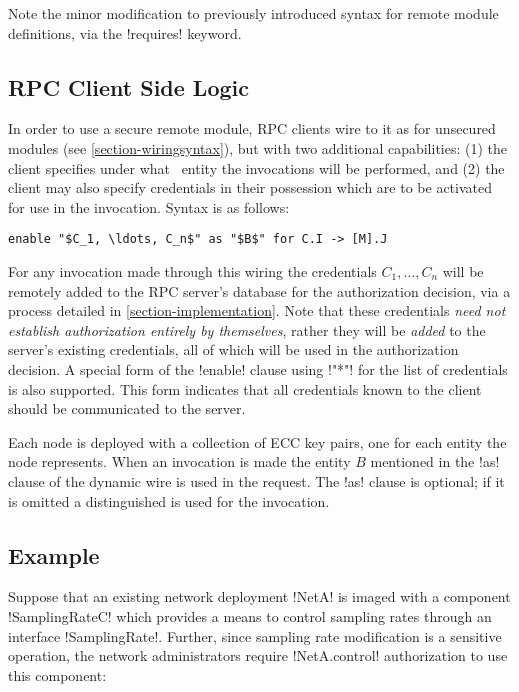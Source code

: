Note the minor modification to previously introduced syntax for remote module definitions, via
the !requires! keyword.

\subsection{RPC Client Side Logic}
\label{section-rpc-client-side}

In order to use a secure remote module, RPC clients wire to it as for unsecured modules (see
\autoref{section-wiringsyntax}), but with two additional capabilities: (1) the client specifies
under what \RT\ entity the invocations will be performed, and (2) the client may also specify
credentials in their possession which are to be activated for use in the invocation. Syntax is
as follows:
\begin{lstlisting}[mathescape=true]
enable "$C_1, \ldots, C_n$" as "$B$" for C.I -> [M].J
\end{lstlisting}
For any invocation made through this wiring the credentials $C_1, \ldots, C_n$ will be remotely
added to the RPC server's database for the authorization decision, via a process detailed in
\autoref{section-implementation}. Note that these credentials \emph{need not establish
  authorization entirely by themselves}, rather they will be \emph{added} to the server's
existing credentials, all of which will be used in the authorization decision. A special form of
the !enable! clause using !"*"! for the list of credentials is also supported. This form
indicates that all credentials known to the client should be communicated to the server.

Each node is deployed with a collection of ECC key pairs, one for each entity the node
represents. When an invocation is made the entity $B$ mentioned in the !as! clause of the
dynamic wire is used in the request. The !as! clause is optional; if it is omitted a
distinguished  is used for the invocation.

\subsection{Example}
\label{section-security-example}

Suppose that an existing network deployment !NetA! is imaged with a component !SamplingRateC!
which provides a means to control sampling rates through an interface !SamplingRate!. Further,
since sampling rate modification is a sensitive operation, the network administrators require
!NetA.control! authorization to use this component:

